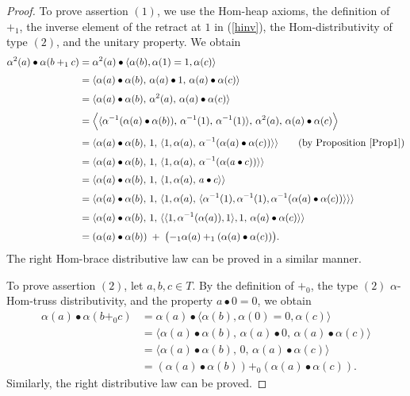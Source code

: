 \documentclass[14pt]{article}
\theoremstyle{Definition}
\theoremstyle{remark}
\begin{document}
\begin{proof}
To prove assertion $(1)$, we use the Hom-heap axioms, the definition of $+_{1}$, the inverse element of the retract at $1$ in (\ref{hinv}), the Hom-distributivity of type $(2)$, and the unitary property. We obtain
\begin{align*}
 \alpha^{2}(a)\bullet\alpha(b+_{1}c) 
 &= \alpha^{2}(a)\bullet\langle \alpha(b),\alpha(1)=1,\alpha(c)\rangle \\[0.3em]
 &= \langle \alpha(a)\bullet\alpha(b),\,\alpha(a)\bullet 1,\,\alpha(a)\bullet\alpha(c)\rangle \\[0.3em]
 &= \langle \alpha(a)\bullet\alpha(b),\,\alpha^{2}(a),\,\alpha(a)\bullet\alpha(c)\rangle \\[0.3em]
 &= \Big\langle \langle \alpha^{-1}(\alpha(a)\bullet\alpha(b)),\,\alpha^{-1}(1),\,\alpha^{-1}(1)\rangle,\,\alpha^{2}(a),\,\alpha(a)\bullet\alpha(c)\Big\rangle \\[0.3em]
 &= \langle \alpha(a)\bullet\alpha(b),\,1,\,\langle 1,\alpha(a),\,\alpha^{-1}(\alpha(a)\bullet\alpha(c))\rangle \rangle 
      \qquad \text{(by Proposition \ref{Prop1})} \\[0.3em]
 &= \langle \alpha(a)\bullet\alpha(b),\,1,\,\langle 1,\alpha(a),\,\alpha^{-1}(\alpha(a\bullet c))\rangle \rangle \\[0.3em]
 &= \langle \alpha(a)\bullet\alpha(b),\,1,\,\langle 1,\alpha(a),\,a\bullet c \rangle \rangle \\[0.3em]
 &= \langle \alpha(a)\bullet\alpha(b),\,1,\,\langle 1,\alpha(a),\,\langle \alpha^{-1}(1),\alpha^{-1}(1),\alpha^{-1}(\alpha(a)\bullet\alpha(c))\rangle \rangle \rangle \\[0.3em]
 &= \langle \alpha(a)\bullet\alpha(b),\,1,\,\langle \langle 1,\alpha^{-1}(\alpha(a)),1\rangle,1,\,\alpha(a)\bullet\alpha(c)\rangle \rangle \\[0.3em]
 &= (\alpha(a)\bullet\alpha(b)) \;+\;\bigl(-_{1}\alpha(a)+_{1}(\alpha(a)\bullet\alpha(c))\bigr).
\end{align*}
The right Hom-brace distributive law can be proved in a similar manner.

\smallskip

To prove assertion $(2)$, let $a,b,c \in T$. By the definition of $+_{0}$, the type $(2)$ $\alpha$-Hom-truss distributivity, and the property $a\bullet 0=0$, we obtain
\begin{align*}
 \alpha(a)\bullet\alpha(b+_{0}c) 
 &= \alpha(a)\bullet\langle \alpha(b),\alpha(0)=0,\alpha(c)\rangle \\[0.3em]
 &= \langle \alpha(a)\bullet\alpha(b),\,\alpha(a)\bullet 0,\,\alpha(a)\bullet\alpha(c)\rangle \\[0.3em]
 &= \langle \alpha(a)\bullet\alpha(b),\,0,\,\alpha(a)\bullet\alpha(c)\rangle \\[0.3em]
 &= (\alpha(a)\bullet\alpha(b)) +_{0} (\alpha(a)\bullet\alpha(c)).
\end{align*}
Similarly, the right distributive law can be proved.
\end{proof}
\end{document}
